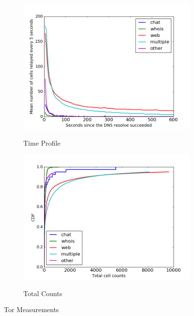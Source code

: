 
\begin{figure} \centering
	\begin{subfigure}[t]{0.32\textwidth} \centering
\includegraphics[scale=0.3]{images/exitmeasurement.png}
		\label{fig:stats_a}
		\caption{Time Profile}
	\end{subfigure}
	\begin{subfigure}[t]{0.32\textwidth} \centering
\includegraphics[scale=0.3]{images/totcellcountscdf.png}
		\label{fig:stats_b}
		\caption{Total Counts}
	\end{subfigure}
	\label{fig:measurements}
	\caption{Tor Measurements}
\end{figure}

